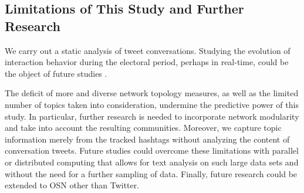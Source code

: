 \subsection{Limitations of This Study and Further Research}
We carry out a static analysis of tweet conversations. Studying the evolution of interaction behavior during the electoral period, perhaps in real-time, could be the object of future studies \citep[see][]{mulder:2019}.

The deficit of more and diverse network topology measures, as well as the limited number of topics taken into consideration, undermine the predictive power of this study. In particular, further research is needed to incorporate network modularity and take into account the resulting communities. Moreover, we capture topic information merely from the tracked hashtags without analyzing the content of conversation tweets. Future studies could overcome these limitations with parallel or distributed computing that allows for text analysis on such large data sets and without the need for a further sampling of data. Finally, future research could be extended to OSN other than Twitter.
